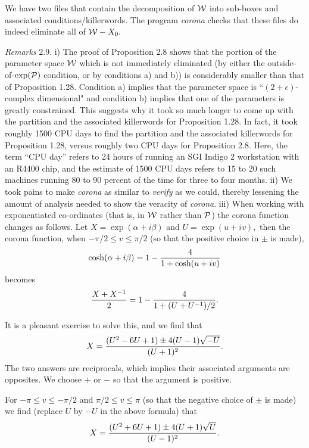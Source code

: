 We have two files that contain the decomposition of ${\cal W}$ into
sub-boxes and associated conditions/killerwords.  The program {\it corona}
checks that these files do indeed eliminate all of
${\cal W} - X_0.$  \enddemo 

{\it Remarks} 2.9.  i)  The proof of Proposition 2.8
shows that the portion of the parameter space ${\cal W}$
which is not immediately eliminated (by either the
outside-of-$\exp({\cal P})$ condition,
or by conditions a) and b))
is considerably smaller than that of Proposition 1.28. Condition a)
implies that the parameter space is ``$(2+\epsilon)$-complex dimensional" and
condition b) implies that one of the parameters is greatly constrained.   This
suggests why it took so much longer to come up with the partition and the
associated killerwords for Proposition 1.28.
In fact, it took roughly 1500 CPU days to find the partition and the
associated killerwords for Proposition 1.28, versus roughly two CPU days for
Proposition 2.8.  Here, the term ``CPU day''  refers to 24 hours of running
an SGI Indigo 2 workstation with an R4400 chip, and the estimate of 1500
CPU days refers to 15 to 20 such machines running 80 to 90 percent of the
time for three to four months.
ii) We took pains to make {\it corona} as similar to {\it verify} as we
could, thereby lessening the amount of analysis needed to show the veracity
of {\it corona}.
iii)  When working with exponentiated co-ordinates (that is, in ${\cal W}$
rather than ${\cal P}$) the corona function changes as follows.  Let $X =
\exp(\alpha + i \beta)$ and
$ U = \exp(u + iv),$  then the corona function, when $-\pi/2 \le v \le
\pi/2$ (so that the positive choice in $\pm$ is made),
$$\cosh(\alpha + i \beta) = 1 - {4 \over 1 + \cosh(u+iv)}$$
becomes
$${X + X^{-1} \over 2} = 1 - {4 \over 1 + (U + U^{-1})/2}.$$

It is a pleasant exercise to solve this, and we find that
$$X = {(U^2 -6U + 1) \pm 4(U - 1)\sqrt{-U} \over (U+1)^2}.$$
The two answers are reciprocals, which implies their associated arguments
are opposites.  We choose $+$ or $-$ so that the argument is positive.

For $-\pi \le v \le -\pi/2$ and $\pi/2 \le v \le \pi$
(so that the negative choice of $\pm$ is made)
we find (replace $U$ by $-U$ in the above formula) that
$$X = {(U^2 + 6U + 1) \pm 4(U + 1)\sqrt{U} \over (U-1)^2}.$$

